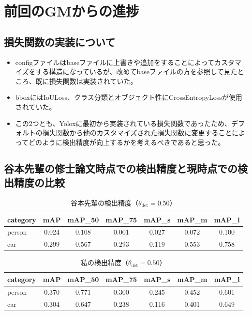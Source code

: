 \documentclass[a4j]{jarticle}
\begin{document}
	\section{前回のGMからの進捗}
	\subsection{損失関数の実装について}
	\begin{itemize}
		\item configファイルはbaseファイルに上書きや追加をすることによってカスタマイズをする構造になっているが、改めてbaseファイルの方を参照して見たところ、既に損失関数は実装されていた。
		\item bboxにはIoULoss、クラス分類とオブジェクト性にCrossEntropyLossが使用されていた。
		\item この2つとも、Yoloxに最初から実装されている損失関数であったため、デフォルトの損失関数から他のカスタマイズされた損失関数に変更することによってどのように検出精度が向上するかを考えるべきであると思った。
	\end{itemize}
	\subsection{谷本先輩の修士論文時点での検出精度と現時点での検出精度の比較}
	\begin{table}[htbp]
	\centering
	\caption{谷本先輩の検出精度（$\theta_{\mathrm{det}}=0.50$）}
		\begin{tabular}{lcccccc}
			\hline
			\textbf{category} & \textbf{mAP} & \textbf{mAP\_50} & \textbf{mAP\_75} & \textbf{mAP\_s} & \textbf{mAP\_m} & \textbf{mAP\_l} \\
			\hline
			person & 0.024 & 0.108 & 0.001 & 0.027 & 0.072 & 0.100 \\
			car    & 0.299 & 0.567 & 0.293 & 0.119 & 0.553 & 0.758 \\
			\hline
		\end{tabular}
	\end{table}

	\begin{table}[htbp]
	\centering
	\caption{私の検出精度（$\theta_{\mathrm{det}}=0.50$）}
		\begin{tabular}{lcccccc}
			\hline
			\textbf{category} & \textbf{mAP} & \textbf{mAP\_50} & \textbf{mAP\_75} & \textbf{mAP\_s} & \textbf{mAP\_m} & \textbf{mAP\_l} \\
			\hline
			person & 0.370 & 0.771 & 0.300 & 0.245 & 0.452 & 0.601 \\
			car    & 0.304 & 0.647 & 0.238 & 0.116 & 0.401 & 0.649 \\
			\hline
		\end{tabular}
	\end{table}
\end{document}

